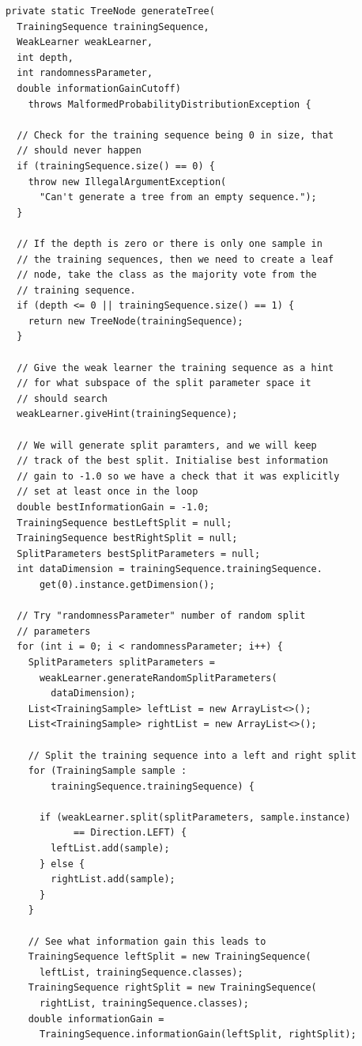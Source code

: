 \documentclass[12pt,twoside,notitlepage]{report}
\begin{document}
    \begin{lstlisting}[caption={The implementation code for tree generation.}, label={lst:actualGenerateTree}]
private static TreeNode generateTree(
  TrainingSequence trainingSequence, 
  WeakLearner weakLearner, 
  int depth, 
  int randomnessParameter, 
  double informationGainCutoff) 
    throws MalformedProbabilityDistributionException {

  // Check for the training sequence being 0 in size, that 
  // should never happen
  if (trainingSequence.size() == 0) {
    throw new IllegalArgumentException(
      "Can't generate a tree from an empty sequence.");
  }
  
  // If the depth is zero or there is only one sample in 
  // the training sequences, then we need to create a leaf 
  // node, take the class as the majority vote from the 
  // training sequence.
  if (depth <= 0 || trainingSequence.size() == 1) {
    return new TreeNode(trainingSequence);
  }
  
  // Give the weak learner the training sequence as a hint
  // for what subspace of the split parameter space it 
  // should search
  weakLearner.giveHint(trainingSequence);
  
  // We will generate split paramters, and we will keep 
  // track of the best split. Initialise best information 
  // gain to -1.0 so we have a check that it was explicitly 
  // set at least once in the loop 
  double bestInformationGain = -1.0;
  TrainingSequence bestLeftSplit = null;
  TrainingSequence bestRightSplit = null;
  SplitParameters bestSplitParameters = null;
  int dataDimension = trainingSequence.trainingSequence.
      get(0).instance.getDimension();
  
  // Try "randomnessParameter" number of random split 
  // parameters
  for (int i = 0; i < randomnessParameter; i++) {
    SplitParameters splitParameters = 
      weakLearner.generateRandomSplitParameters(
        dataDimension);
    List<TrainingSample> leftList = new ArrayList<>();
    List<TrainingSample> rightList = new ArrayList<>();
    
    // Split the training sequence into a left and right split
    for (TrainingSample sample : 
        trainingSequence.trainingSequence) {

      if (weakLearner.split(splitParameters, sample.instance) 
            == Direction.LEFT) {
        leftList.add(sample);
      } else {
        rightList.add(sample);
      }
    }
    
    // See what information gain this leads to
    TrainingSequence leftSplit = new TrainingSequence(
      leftList, trainingSequence.classes);
    TrainingSequence rightSplit = new TrainingSequence(
      rightList, trainingSequence.classes);
    double informationGain = 
      TrainingSequence.informationGain(leftSplit, rightSplit);
    

\end{lstlisting}
\end{document}
